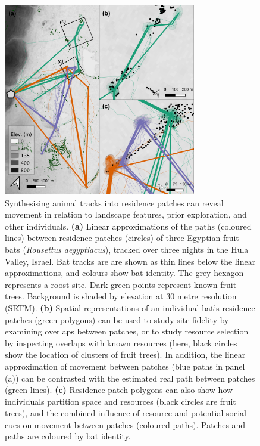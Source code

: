 \documentclass[10pt,paper=a4,headings=standardclasses
]{scrartcl}
\begin{document}
\begin{figure}[h!]
    \centering
    \includegraphics[width=0.75\textwidth]{figures/fig_07_bats.png}
    \caption{Synthesising animal tracks into residence patches can reveal movement in relation to landscape features, prior exploration, and other individuals.
    \textbf{(a)} Linear approximations of the paths (coloured lines) between residence patches (circles) of three Egyptian fruit bats (\textit{Rousettus aegyptiacus}), tracked over three nights in the Hula Valley, Israel.
    Bat tracks are are shown as thin lines below the linear approximations, and colours show bat identity. The grey hexagon represents a roost site.
    Dark green points represent known fruit trees.
    Background is shaded by elevation at 30 metre resolution (SRTM).    
    \textbf{(b)} Spatial representations of an individual bat's residence patches (green polygons) can be used to study site-fidelity by examining overlaps between patches, or to study resource selection by inspecting overlaps with known resources (here, black circles show the location of clusters of fruit trees).
    In addition, the linear approximation of movement between patches (blue paths in panel (a)) can be contrasted with the estimated real path between patches (green lines).
    \textbf{(c)} Residence patch polygons can also show how individuals partition space and resources (black circles are fruit trees), and the combined influence of resource and potential social cues on movement between patches (coloured paths).
    Patches and paths are coloured by bat identity.}
    \label{fig:figure_bats}
\end{figure}
\end{document}
